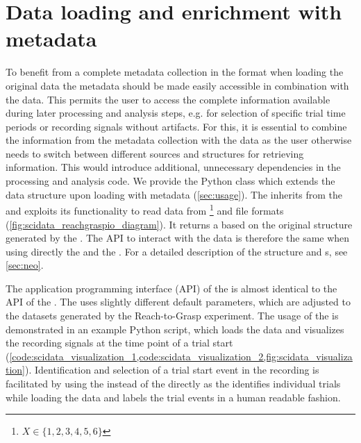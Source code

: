 \section{Data loading and enrichment with metadata}
\label{sec:data_loading_and_enrichment}
To benefit from a complete metadata collection in the  format when loading the original data the metadata should be made easily accessible in combination with the data. This permits the user to access the complete information available during later processing and analysis steps, e.g. for selection of specific trial time periods or recording signals without artifacts. For this, it is essential to combine the information from the metadata collection with the data as the user otherwise needs to switch between different sources and structures for retrieving information. This would introduce additional, unnecessary dependencies in the processing and analysis code.
We provide the  Python class which extends the  data structure upon loading with metadata (\cref{sec:usage}). The  inherits from the   and exploits its functionality to read data from \footnote{$X \in \{1,2,3,4,5,6\}$} and  file formats (\cref{fig:scidata_reachgraspio_diagram}). It returns a   based on the original structure generated by the  . The API to interact with the data is therefore the same when using directly the   and the . For a detailed description of the  structure and s, see \cref{sec:neo}.

The application programming interface (API) of the  is almost identical to the API of the . The  uses slightly different default parameters, which are adjusted to the datasets generated by the Reach-to-Grasp experiment. The usage of the  is demonstrated in an example Python script, which loads the data and visualizes the recording signals at the time point of a trial start (\cref{code:scidata_visualization_1,code:scidata_visualization_2,fig:scidata_visualization}).
Identification and selection of a trial start event in the recording is facilitated by using the  instead of the  directly as the  identifies individual trials while loading the data and labels the trial events in a human readable fashion.



